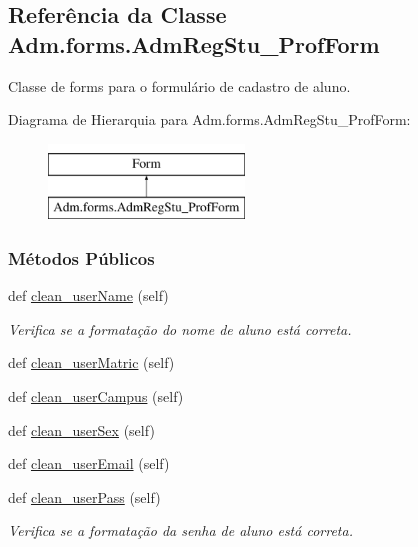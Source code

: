 \hypertarget{classAdm_1_1forms_1_1AdmRegStu__ProfForm}{}\subsection{Referência da Classe Adm.\+forms.\+Adm\+Reg\+Stu\+\_\+\+Prof\+Form}
\label{classAdm_1_1forms_1_1AdmRegStu__ProfForm}


Classe de forms para o formulário de cadastro de aluno.  


Diagrama de Hierarquia para Adm.\+forms.\+Adm\+Reg\+Stu\+\_\+\+Prof\+Form\+:\begin{figure}[H]
\begin{center}
\leavevmode
\includegraphics[height=2.000000cm]{d5/d88/classAdm_1_1forms_1_1AdmRegStu__ProfForm}
\end{center}
\end{figure}
\subsubsection*{Métodos Públicos}
\begin{DoxyCompactItemize}
\item 
def \hyperlink{classAdm_1_1forms_1_1AdmRegStu__ProfForm_a509b621082b91a521578a8c11f19b993}{clean\+\_\+user\+Name} (self)
\begin{DoxyCompactList}\small\item\em Verifica se a formatação do nome de aluno está correta. \end{DoxyCompactList}\item 
def \hyperlink{classAdm_1_1forms_1_1AdmRegStu__ProfForm_a86cae645930f3c11640abea65fcd1322}{clean\+\_\+user\+Matric} (self)
\item 
def \hyperlink{classAdm_1_1forms_1_1AdmRegStu__ProfForm_a74730a46efbdfcd4365717fce26b295a}{clean\+\_\+user\+Campus} (self)
\item 
def \hyperlink{classAdm_1_1forms_1_1AdmRegStu__ProfForm_ac2623ef3e23567b9916798efd37846aa}{clean\+\_\+user\+Sex} (self)
\item 
def \hyperlink{classAdm_1_1forms_1_1AdmRegStu__ProfForm_a2175e6df2259bcca182c3eb54cef065e}{clean\+\_\+user\+Email} (self)
\item 
def \hyperlink{classAdm_1_1forms_1_1AdmRegStu__ProfForm_a4ad4a629f7a34d7657b6d308616f5696}{clean\+\_\+user\+Pass} (self)
\begin{DoxyCompactList}\small\item\em Verifica se a formatação da senha de aluno está correta. \end{DoxyCompactList}\end{DoxyCompactItemize}
